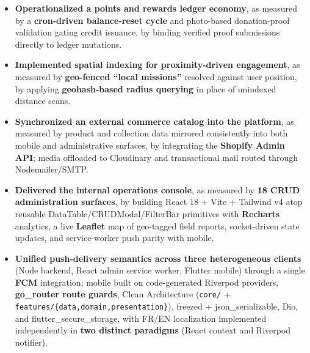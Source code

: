 \documentclass[10pt,letterpaper]{article}
\newenvironment{highlights}{
  \begin{itemize}[topsep=2pt,parsep=1pt,partopsep=0pt,itemsep=0pt,leftmargin=10pt]
}{\end{itemize}}
\begin{document}
\begin{highlights}
  \item \textbf{Operationalized a points and rewards ledger economy}, as measured by a \textbf{cron-driven balance-reset cycle} and photo-based donation-proof validation gating credit issuance, by binding verified proof submissions directly to ledger mutations.
  \item \textbf{Implemented spatial indexing for proximity-driven engagement}, as measured by \textbf{geo-fenced ``local missions''} resolved against user position, by applying \textbf{geohash-based radius querying} in place of unindexed distance scans.
  \item \textbf{Synchronized an external commerce catalog into the platform}, as measured by product and collection data mirrored consistently into both mobile and administrative surfaces, by integrating the \textbf{Shopify Admin API}; media offloaded to Cloudinary and transactional mail routed through Nodemailer/SMTP.
  \item \textbf{Delivered the internal operations console}, as measured by \textbf{18 CRUD administration surfaces}, by building React 18 + Vite + Tailwind v4 atop reusable DataTable/CRUDModal/FilterBar primitives with \textbf{Recharts} analytics, a live \textbf{Leaflet} map of geo-tagged field reports, socket-driven state updates, and service-worker push parity with mobile.
  \item \textbf{Unified push-delivery semantics across three heterogeneous clients} (Node backend, React admin service worker, Flutter mobile) through a single \textbf{FCM} integration; mobile built on code-generated Riverpod providers, \textbf{go\_router route guards}, Clean Architecture (\texttt{core/} + \texttt{features/\{data,domain,presentation\}}), freezed + json\_serializable, Dio, and flutter\_secure\_storage, with FR/EN localization implemented independently in \textbf{two distinct paradigms} (React context and Riverpod notifier).
\end{highlights}

\vspace{3pt}
\end{document}
